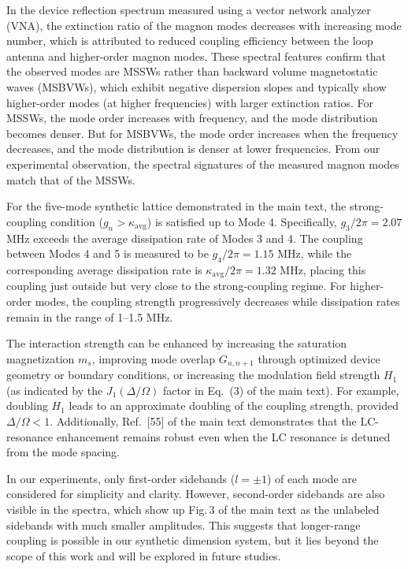 \documentclass[
twocolumn,

superscriptaddress,









 amsmath,amssymb,
 aps,


prl,




]{revtex4-2}
\begin{document}
In the device reflection spectrum measured using a vector network analyzer (VNA), the extinction ratio of the magnon modes decreases with increasing mode number, which is attributed to reduced coupling efficiency between the loop antenna and higher-order magnon modes. These spectral features confirm that the observed modes are MSSWs rather than backward volume magnetostatic waves (MSBVWs), which exhibit negative dispersion slopes and typically show higher-order modes (at higher frequencies) with larger extinction ratios. For MSSWs, the mode order increases with frequency, and the mode distribution becomes denser. But for MSBVWs, the mode order increases when the frequency decreases, and the mode distribution is denser at lower frequencies. From our experimental observation, the spectral signatures of the measured magnon modes match that of the MSSWs.

For the five-mode synthetic lattice demonstrated in the main text, the strong-coupling condition ($g_n > \kappa_{\text{avg}}$) is satisfied up to Mode 4. Specifically, $g_3/2\pi = 2.07$ MHz exceeds the average dissipation rate of Modes 3 and 4. The coupling between Modes 4 and 5 is measured to be $g_4/2\pi = 1.15$ MHz, while the corresponding average dissipation rate is $\kappa_{\text{avg}}/2\pi = 1.32$ MHz, placing this coupling just outside but very close to the strong-coupling regime. For higher-order modes, the coupling strength progressively decreases while dissipation rates remain in the range of 1–1.5 MHz.

The interaction strength can be enhanced by increasing the saturation magnetization $m_s$, improving mode overlap $G_{n,n+1}$  through optimized device geometry or boundary conditions, or increasing the modulation field strength $H_1$ (as indicated by the $J_1(\Delta/\Omega)$ factor in Eq.~(3) of the main text). For example, doubling $H_1$ leads to an approximate doubling of the coupling strength, provided $\Delta/\Omega < 1$. Additionally, Ref.~[55] of the main text demonstrates that the LC-resonance enhancement remains robust even when the LC resonance is detuned from the mode spacing.



In our experiments, only first-order sidebands ($l = \pm 1$) of each mode are considered for simplicity and clarity. However, second-order sidebands are also visible in the spectra, which show up Fig.\,3 of the main text as the unlabeled sidebands with much smaller amplitudes. This suggests that longer-range coupling is possible in our synthetic dimension system, but it lies beyond the scope of this work and will be explored in future studies.
\end{document}
